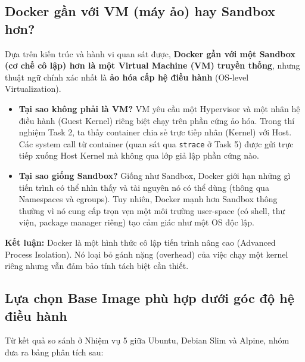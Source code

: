 \subsection{Docker gần với VM (máy ảo) hay Sandbox hơn?}
Dựa trên kiến trúc và hành vi quan sát được, \textbf{Docker gần với một Sandbox (cơ chế cô lập) hơn là một Virtual Machine (VM) truyền thống}, nhưng thuật ngữ chính xác nhất là \textbf{ảo hóa cấp hệ điều hành} (OS-level Virtualization).

\begin{itemize}
    \item \textbf{Tại sao không phải là VM?} VM yêu cầu một Hypervisor và một nhân hệ điều hành (Guest Kernel) riêng biệt chạy trên phần cứng ảo hóa. Trong thí nghiệm Task 2, ta thấy container chia sẻ trực tiếp nhân (Kernel) với Host. Các system call từ container (quan sát qua \texttt{strace} ở Task 5) được gửi trực tiếp xuống Host Kernel mà không qua lớp giả lập phần cứng nào.
    
    \item \textbf{Tại sao giống Sandbox?} Giống như Sandbox, Docker giới hạn những gì tiến trình có thể nhìn thấy và tài nguyên nó có thể dùng (thông qua Namespaces và cgroups). Tuy nhiên, Docker mạnh hơn Sandbox thông thường vì nó cung cấp trọn vẹn một môi trường user-space (có shell, thư viện, package manager riêng) tạo cảm giác như một OS độc lập.
\end{itemize}

\textbf{Kết luận:} Docker là một hình thức cô lập tiến trình nâng cao (Advanced Process Isolation). Nó loại bỏ gánh nặng (overhead) của việc chạy một kernel riêng nhưng vẫn đảm bảo tính tách biệt cần thiết.

\subsection{Lựa chọn Base Image phù hợp dưới góc độ hệ điều hành}
Từ kết quả so sánh ở Nhiệm vụ 5 giữa Ubuntu, Debian Slim và Alpine, nhóm đưa ra bảng phân tích sau:

